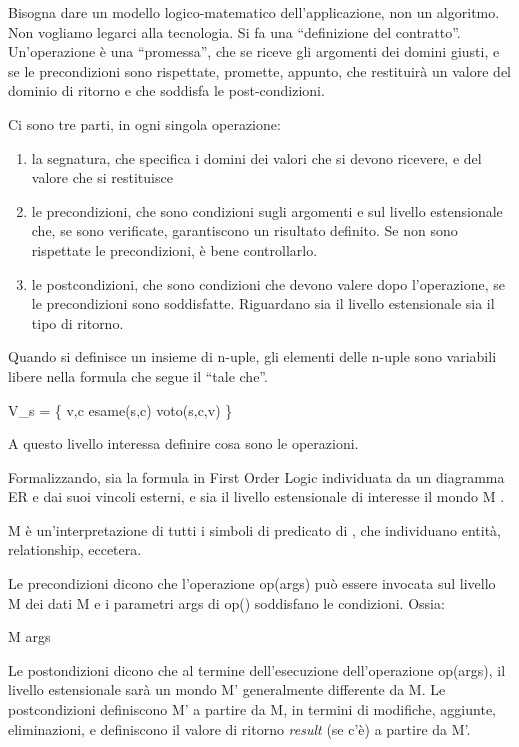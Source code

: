 Bisogna dare un modello logico-matematico dell'applicazione, non un algoritmo. Non vogliamo legarci alla tecnologia. Si fa una ``definizione del contratto''. Un'operazione \`e una ``promessa'', che se riceve gli argomenti dei domini giusti, e se le precondizioni sono rispettate, promette, appunto, che restituir\`a un valore del dominio di ritorno e che soddisfa le post-condizioni.

Ci sono tre parti, in ogni singola operazione:
\begin{enumerate}
    \item la segnatura, che specifica i domini dei valori che si devono ricevere, e del valore che si restituisce
    \item le precondizioni, che sono condizioni sugli argomenti e sul livello estensionale che, se sono verificate, garantiscono un risultato definito. Se non sono rispettate le precondizioni, \`e bene controllarlo.
    \item le postcondizioni, che sono condizioni che devono valere dopo l'operazione, se le precondizioni sono soddisfatte. Riguardano sia il livello estensionale sia il tipo di ritorno.
\end{enumerate}

Quando si definisce un insieme di n-uple, gli elementi delle n-uple sono variabili libere nella formula che segue il ``tale che''.

V_s = \{ \langle v,c \rangle \mid esame(s,c) \land voto(s,c,v) \}

A questo livello interessa definire cosa sono le operazioni.

Formalizzando, sia \Phi la formula in First Order Logic individuata da un diagramma ER e dai suoi vincoli esterni, e sia il livello estensionale di interesse il mondo M \models \Phi.

M \`e un'interpretazione di tutti i simboli di predicato di \Phi, che individuano entit\`a, relationship, eccetera.

Le precondizioni dicono che l'operazione op(args) pu\`o essere invocata sul livello M dei dati \iff M e i parametri args di op() soddisfano le condizioni. Ossia:

M \land args \models \rho

Le postondizioni dicono che al termine dell'esecuzione dell'operazione op(args), il livello estensionale sar\`a un mondo M' generalmente differente da M. Le postcondizioni definiscono M' a partire da M, in termini di modifiche, aggiunte, eliminazioni, e definiscono il valore di ritorno \emph{result} (se c'\`e) a partire da M'.

